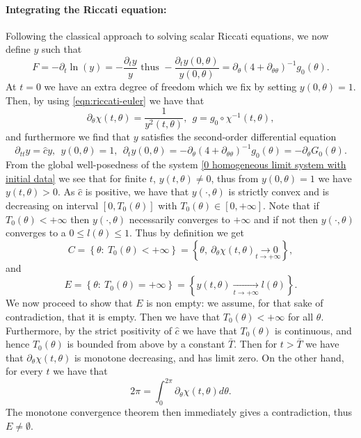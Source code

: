 \documentclass[10pt]{article}
\numberwithin{equation}{section}
\theoremstyle{plain}
\theoremstyle{definition}
\numberwithin{equation}{section}
\begin{document}
\paragraph{\textbf{Integrating the Riccati equation:}}
Following the classical approach to solving scalar Riccati equations, we now define $y$ such that \[F=-\partial_t\ln\left(y\right)=-\frac{\partial_ty}{y}\text{ thus }-\frac{\partial_ty(0,\theta)}{y(0,\theta)}=\partial_\theta(4+\partial_{\theta \theta})^{-1} g_0(\theta).\] At $t=0$ we have an extra degree of freedom which we fix by setting $y(0,\theta)=1$. Then, by using \eqref{eqn:riccati-euler} we have that 
\[
\partial_\theta \chi(t,\theta)=\frac{1}{y^2(t,\theta)}, \ \ g=g_0\circ \chi^{-1}(t,\theta),
\]
and furthermore we find that $y$ satisfies the second-order differential equation
\begin{equation}\label{eqn:y-ODE}
\partial_{tt}y=\hat cy, \ \ y(0,\theta)=1, \ \ \partial_t y(0,\theta)=-\partial_\theta(4+\partial_{\theta \theta})^{-1} g_0(\theta)=-\partial_\theta G_0(\theta).
\end{equation}
From the global well-posedness of the system \eqref{0 homogeneous limit system with initial data} we see that for finite $t$, $y(t,\theta)\neq0$, thus from $y(0,\theta)=1$ we have $y(t,\theta)>0$. As $\hat c$ is positive, we have that $y(\cdot,\theta)$ is strictly convex and is decreasing on interval $[0,T_0(\theta)]$ with $T_0(\theta)\in[0,+\infty]$. Note that if $T_0(\theta)<+\infty$ then $y(\cdot,\theta)$ necessarily converges to $+\infty$ and if not then $y(\cdot,\theta)$ converges to a $0\leq l(\theta)\leq 1$. Thus by definition we get 
\[C=\left\{\theta: \ T_0(\theta)<+\infty\right\}=\left\{\theta,\ \partial_\theta\chi(t,\theta)\underset{t\rightarrow+\infty}{\longrightarrow0}\right\},
\]
and
\[
E=\left\{\theta: \ T_0(\theta)=+\infty \right\} = \left\{y(t,\theta)\underset{t\rightarrow+\infty}{\longrightarrow}l(\theta) \right\}.
 \]
We now proceed to show that $E$ is non empty: we assume, for that sake of contradiction, that it is empty. Then we have that $T_0(\theta)<+\infty$ for all $\theta$. Furthermore, by the strict positivity of $\hat c$ we have that $T_0(\theta)$ is continuous, and hence $T_0(\theta)$ is bounded from above by a constant $\bar T$. Then for $t > \bar T$ we have that $\partial_\theta \chi(t,\theta)$ is monotone decreasing, and has limit zero. On the other hand, for every $t$ we have that
\begin{equation}\label{2 pi integral}
2\pi = \int_0^{2\pi} \partial_\theta\chi(t,\theta)d\theta.
\end{equation}
The monotone convergence theorem then immediately gives a contradiction, thus $E\neq \emptyset$.
\end{document}
